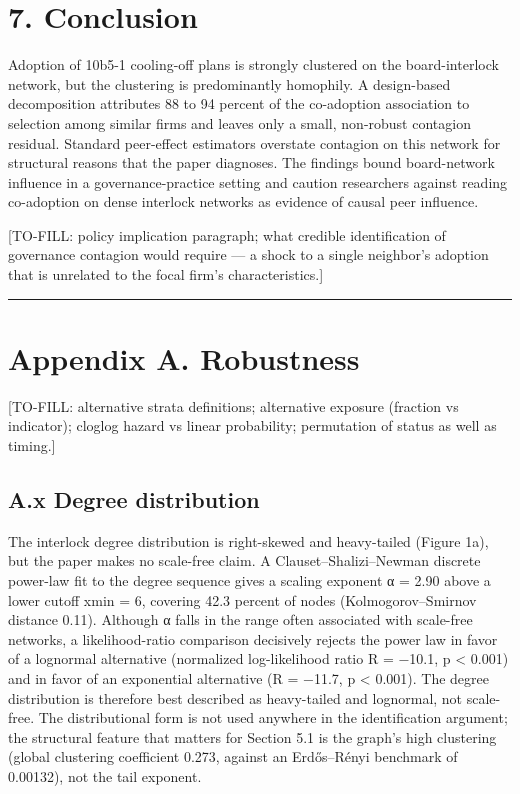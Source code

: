 \documentclass[
  a4paper,
]{article}
\begin{document}
\section{7. Conclusion}\label{conclusion}

Adoption of 10b5-1 cooling-off plans is strongly clustered on the
board-interlock network, but the clustering is predominantly homophily.
A design-based decomposition attributes 88 to 94 percent of the
co-adoption association to selection among similar firms and leaves only
a small, non-robust contagion residual. Standard peer-effect estimators
overstate contagion on this network for structural reasons that the
paper diagnoses. The findings bound board-network influence in a
governance-practice setting and caution researchers against reading
co-adoption on dense interlock networks as evidence of causal peer
influence.

{[}TO-FILL: policy implication paragraph; what credible identification
of governance contagion would require --- a shock to a single neighbor's
adoption that is unrelated to the focal firm's characteristics.{]}

\begin{center}\rule{0.5\linewidth}{0.5pt}\end{center}

\section{Appendix A. Robustness}\label{appendix-a.-robustness}

{[}TO-FILL: alternative strata definitions; alternative exposure
(fraction vs indicator); cloglog hazard vs linear probability;
permutation of status as well as timing.{]}

\subsection{A.x Degree distribution}\label{a.x-degree-distribution}

The interlock degree distribution is right-skewed and heavy-tailed
(Figure 1a), but the paper makes no scale-free claim. A
Clauset--Shalizi--Newman discrete power-law fit to the degree sequence
gives a scaling exponent α = 2.90 above a lower cutoff xmin = 6,
covering 42.3 percent of nodes (Kolmogorov--Smirnov distance 0.11).
Although α falls in the range often associated with scale-free networks,
a likelihood-ratio comparison decisively rejects the power law in favor
of a lognormal alternative (normalized log-likelihood ratio R = −10.1, p
\textless{} 0.001) and in favor of an exponential alternative (R =
−11.7, p \textless{} 0.001). The degree distribution is therefore best
described as heavy-tailed and lognormal, not scale-free. The
distributional form is not used anywhere in the identification argument;
the structural feature that matters for Section 5.1 is the graph's high
clustering (global clustering coefficient 0.273, against an Erdős--Rényi
benchmark of 0.00132), not the tail exponent.
\end{document}
